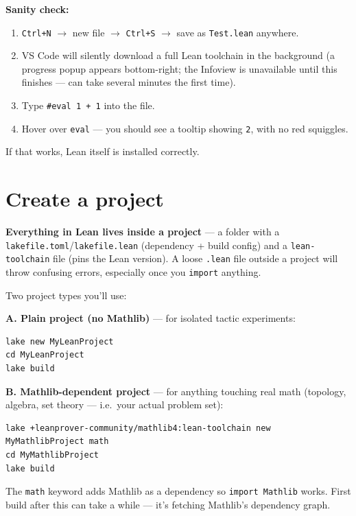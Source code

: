 \textbf{Sanity check:}

\begin{enumerate}
  \item \texttt{Ctrl+N} $\rightarrow$ new file $\rightarrow$ \texttt{Ctrl+S} $\rightarrow$ save as \texttt{Test.lean} anywhere.
  \item VS Code will silently download a full Lean toolchain in the background (a progress popup appears bottom-right; the Infoview is unavailable until this finishes --- can take several minutes the first time).
  \item Type \texttt{\#eval 1 + 1} into the file.
  \item Hover over \texttt{eval} --- you should see a tooltip showing \texttt{2}, with no red squiggles.
\end{enumerate}

If that works, Lean itself is installed correctly.

\section{Create a project}

\textbf{Everything in Lean lives inside a project} --- a folder with a \texttt{lakefile.toml}/\texttt{lakefile.lean} (dependency + build config) and a \texttt{lean-toolchain} file (pins the Lean version). A loose \texttt{.lean} file outside a project will throw confusing errors, especially once you \texttt{import} anything.

Two project types you'll use:

\textbf{A. Plain project (no Mathlib)} --- for isolated tactic experiments:

\begin{verbatim}
lake new MyLeanProject
cd MyLeanProject
lake build
\end{verbatim}

\textbf{B. Mathlib-dependent project} --- for anything touching real math (topology, algebra, set theory --- i.e.\ your actual problem set):

\begin{verbatim}
lake +leanprover-community/mathlib4:lean-toolchain new MyMathlibProject math
cd MyMathlibProject
lake build
\end{verbatim}

The \texttt{math} keyword adds Mathlib as a dependency so \texttt{import Mathlib} works. First build after this can take a while --- it's fetching Mathlib's dependency graph.

